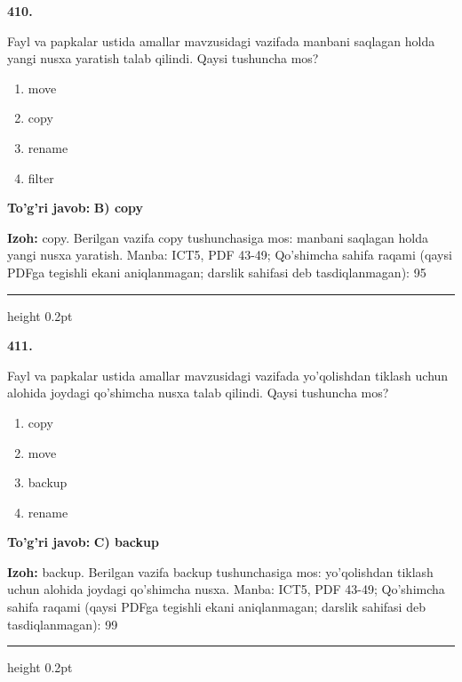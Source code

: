 \documentclass[10pt,a4paper]{article}
\begin{document}
{\bfseries\sffamily\color{ink} 410.}
\par
Fayl va papkalar ustida amallar mavzusidagi vazifada manbani saqlagan holda yangi nusxa yaratish talab qilindi. Qaysi tushuncha mos?
\begin{enumerate}[label=\Alph*),leftmargin=9mm]
\item move
\item copy
\item rename
\item filter
\end{enumerate}
\begin{tcolorbox}[enhanced,breakable,colback=teal!4,colframe=teal!60!black,boxrule=0.45pt,arc=1.2mm,left=2.7mm,right=2.7mm,top=1.8mm,bottom=1.8mm,before skip=2mm,after skip=2mm]
{\bfseries\sffamily\color{teal}To'g'ri javob:} \textbf{B) copy}
\par\smallskip
{\bfseries Izoh:} copy. Berilgan vazifa copy tushunchasiga mos: manbani saqlagan holda yangi nusxa yaratish. Manba: ICT5, PDF 43-49; Qo'shimcha sahifa raqami (qaysi PDFga tegishli ekani aniqlanmagan; darslik sahifasi deb tasdiqlanmagan): 95
\end{tcolorbox}
\vspace{2mm}\hrule height 0.2pt\vspace{3mm}

{\bfseries\sffamily\color{ink} 411.}
\par
Fayl va papkalar ustida amallar mavzusidagi vazifada yo'qolishdan tiklash uchun alohida joydagi qo'shimcha nusxa talab qilindi. Qaysi tushuncha mos?
\begin{enumerate}[label=\Alph*),leftmargin=9mm]
\item copy
\item move
\item backup
\item rename
\end{enumerate}
\begin{tcolorbox}[enhanced,breakable,colback=teal!4,colframe=teal!60!black,boxrule=0.45pt,arc=1.2mm,left=2.7mm,right=2.7mm,top=1.8mm,bottom=1.8mm,before skip=2mm,after skip=2mm]
{\bfseries\sffamily\color{teal}To'g'ri javob:} \textbf{C) backup}
\par\smallskip
{\bfseries Izoh:} backup. Berilgan vazifa backup tushunchasiga mos: yo'qolishdan tiklash uchun alohida joydagi qo'shimcha nusxa. Manba: ICT5, PDF 43-49; Qo'shimcha sahifa raqami (qaysi PDFga tegishli ekani aniqlanmagan; darslik sahifasi deb tasdiqlanmagan): 99
\end{tcolorbox}
\vspace{2mm}\hrule height 0.2pt\vspace{3mm}
\end{document}
